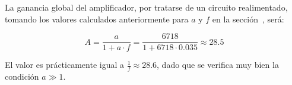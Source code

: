 \vspace{1.5cm}

La ganancia global del amplificador, por tratarse de un circuito realimentado, tomando los valores calculados anteriormente para $a$ y $f$ en la sección~, será:

\begin{equation}
\boxed{ A = \frac{a}{1 + a \cdot f} = \frac{6718}{1 + 6718 \cdot 0.035} \approx 28.5 }
\end{equation}

El valor es prácticamente igual a $\frac{1}{f} \approx 28.6$, dado que se verifica muy bien la condición $a \gg 1$.


\vfill

\clearpage
